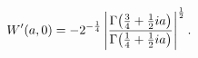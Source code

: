 \[\mathop{W\/}\nolimits'\!\left(a,0\right)=-2^{-\frac{1}{4}}\left|\frac{\mathop{%
\Gamma\/}\nolimits\!\left(\tfrac{3}{4}+\tfrac{1}{2}ia\right)}{\mathop{\Gamma\/%
}\nolimits\!\left(\tfrac{1}{4}+\tfrac{1}{2}ia\right)}\right|^{\frac{1}{2}}.\]
